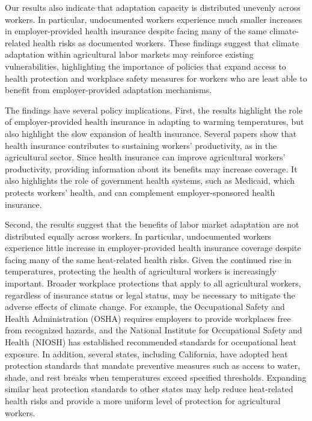 \documentclass[12pt]{article}
\begin{document}
Our results also indicate that adaptation capacity is distributed unevenly across workers. In particular, undocumented workers experience much smaller increases in employer-provided health insurance despite facing many of the same climate-related health risks as documented workers. These findings suggest that climate adaptation within agricultural labor markets may reinforce existing vulnerabilities, highlighting the importance of policies that expand access to health protection and workplace safety measures for workers who are least able to benefit from employer-provided adaptation mechanisms.

The findings have several policy implications. First, the results highlight the role of employer-provided health insurance in adapting to warming temperatures, but also highlight the slow expansion of health insurance. Several papers show that health insurance contributes to sustaining workers' productivity, as in the agricultural sector. Since health insurance can improve agricultural workers' productivity, providing information about its benefits may increase coverage. It also highlights the role of government health systems, such as Medicaid, which protects workers' health, and can complement employer-sponsored health insurance. 

Second, the results suggest that the benefits of labor market adaptation are not distributed equally across workers. In particular, undocumented workers experience little increase in employer-provided health insurance coverage despite facing many of the same heat-related health risks. Given the continued rise in temperatures, protecting the health of agricultural workers is increasingly important. Broader workplace protections that apply to all agricultural workers, regardless of insurance status or legal status, may be necessary to mitigate the adverse effects of climate change. For example, the Occupational Safety and Health Administration (OSHA) requires employers to provide workplaces free from recognized hazards, and the National Institute for Occupational Safety and Health (NIOSH) has established recommended standards for occupational heat exposure. In addition, several states, including California, have adopted heat protection standards that mandate preventive measures such as access to water, shade, and rest breaks when temperatures exceed specified thresholds. Expanding similar heat protection standards to other states may help reduce heat-related health risks and provide a more uniform level of protection for agricultural workers.
\end{document}
